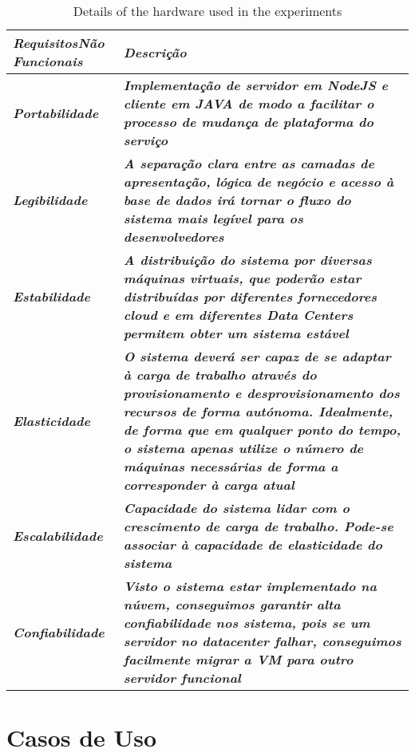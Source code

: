 \documentclass[runningheads]{llncs}
\begin{document}
\begin{table}[htbp]
	\caption{Details of the hardware used in the experiments}
	\begin{center}
		\begin{tabular}{|p{3.5cm}|p{9.5cm}|}
		\hline
			\textbf{\textit{Requisitos\newline Não Funcionais}} & \textbf{\textit{Descrição}}\\ \hline
			\textbf{\textit{Portabilidade}} & \textbf{\textit{Implementação de servidor em NodeJS e cliente em JAVA de modo a facilitar o processo de mudança de plataforma do serviço}} \\ \hline
			\textbf{\textit{Legibilidade}} & \textbf{\textit{A separação clara entre as camadas de apresentação, lógica de negócio e acesso à base de dados irá tornar o fluxo do sistema mais legível para os desenvolvedores}} \\ \hline
			\textbf{\textit{Estabilidade}} & \textbf{\textit{A distribuição do sistema por diversas máquinas virtuais, que poderão estar distribuídas por diferentes fornecedores cloud e em diferentes Data Centers permitem obter um sistema estável}} \\ \hline
			\textbf{\textit{Elasticidade}} & \textbf{\textit{O sistema deverá ser capaz de se adaptar à carga de trabalho através do provisionamento e desprovisionamento dos recursos de forma autónoma. Idealmente, de forma que em qualquer ponto do tempo, o sistema apenas utilize o número de máquinas necessárias de forma a corresponder à carga atual}} \\ \hline
			\textbf{\textit{Escalabilidade}} & \textbf{\textit{Capacidade do sistema lidar com o crescimento de carga de trabalho. Pode-se associar à capacidade de elasticidade do sistema}} \\ \hline
			\textbf{\textit{Confiabilidade}} & \textbf{\textit{Visto o sistema estar implementado na núvem, conseguimos garantir alta confiabilidade nos sistema, pois se um servidor no datacenter falhar, conseguimos facilmente migrar a VM para outro servidor funcional}} \\ \hline
	\end{tabular}
	\label{tab1}
	\end{center}
\end{table}
\section{Casos de Uso}
\end{document}
